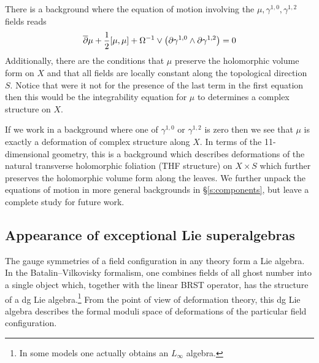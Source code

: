 There is a background where the equation of motion involving the $\mu, \gamma^{1,0}, \gamma^{1,2}$ fields reads
\begin{align*}
\overline{\partial} \mu + \frac12 [\mu, \mu] + \Omega^{-1} \vee \left(\partial \gamma^{1,0} \wedge \partial \gamma^{1,2} \right) & = 0 \\
\end{align*}
Additionally, there are the conditions that $\mu$ preserve the holomorphic volume form on $X$ and that all fields are locally constant along the topological direction $S$.  
Notice that were it not for the presence of the last term in the first equation then this would be the integrability equation for $\mu$ to determines a complex structure on $X$.

If we work in a background where one of $\gamma^{1,0}$ or $\gamma^{1,2}$ is zero then we see that $\mu$ is exactly a deformation of complex structure along $X$. 
In terms of the 11-dimensional geometry, this is a background which describes deformations of the natural transverse holomorphic foliation (THF structure) on $X \times S$ which further preserves the holomorphic volume form along the leaves.
We further unpack the equations of motion in more general backgrounds in \S \ref{s:components}, but leave a complete study for future work.


\subsection*{Appearance of exceptional Lie superalgebras}

The gauge symmetries of a field configuration in any theory form a Lie algebra. 
In the Batalin--Vilkovisky formalism, one combines fields of all ghost number into a single object which, together with the linear BRST operator, has the structure of a dg Lie algebra.\footnote{In some models one actually obtains an $L_\infty$ algebra.} 
From the point of view of deformation theory, this dg Lie algebra describes the formal moduli space of deformations of the particular field configuration. 

